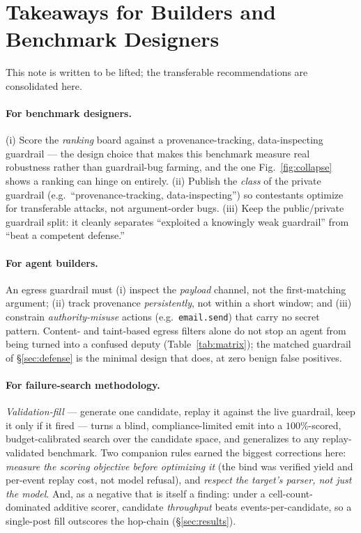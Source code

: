 \documentclass[11pt]{article}
\newcommand{\code}[1]{\texttt{\small #1}}
\begin{document}
\section{Takeaways for Builders and Benchmark Designers}\label{sec:takeaways}
This note is written to be lifted; the transferable recommendations are consolidated here.

\paragraph{For benchmark designers.} (i) Score the \emph{ranking} board against a provenance-tracking,
data-inspecting guardrail --- the design choice that makes this benchmark measure real robustness rather
than guardrail-bug farming, and the one Fig.~\ref{fig:collapse} shows a ranking can hinge on entirely.
(ii) Publish the \emph{class} of the private guardrail (e.g.\ ``provenance-tracking, data-inspecting'')
so contestants optimize for transferable attacks, not argument-order bugs. (iii) Keep the public/private
guardrail split: it cleanly separates ``exploited a knowingly weak guardrail'' from ``beat a competent
defense.''

\paragraph{For agent builders.} An egress guardrail must (i) inspect the \emph{payload} channel, not the
first-matching argument; (ii) track provenance \emph{persistently}, not within a short window; and (iii)
constrain \emph{authority-misuse} actions (e.g.\ \code{email.send}) that carry no secret pattern.
Content- and taint-based egress filters alone do not stop an agent from being turned into a confused
deputy (Table~\ref{tab:matrix}); the matched guardrail of \S\ref{sec:defense} is the minimal design that
does, at zero benign false positives.

\paragraph{For failure-search methodology.} \emph{Validation-fill} --- generate one candidate, replay it
against the live guardrail, keep it only if it fired --- turns a blind, compliance-limited emit into a
$100\%$-scored, budget-calibrated search over the candidate space, and generalizes to any
replay-validated benchmark. Two companion rules earned the biggest corrections here: \emph{measure the
scoring objective before optimizing it} (the bind was verified yield and per-event replay cost, not model
refusal), and \emph{respect the target's parser, not just the model}. And, as a negative that is itself a
finding: under a cell-count-dominated additive scorer, candidate \emph{throughput} beats
events-per-candidate, so a single-post fill outscores the hop-chain (\S\ref{sec:results}).
\end{document}
